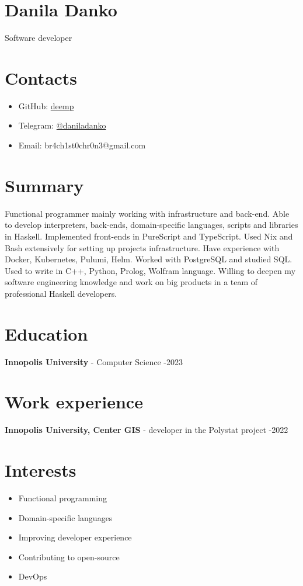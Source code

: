 \documentclass[twocolumn,11pt]{report}
\begin{document}
\section*{\huge Danila Danko}

Software developer

\section*{Contacts}
\begin{itemize}
     \item GitHub: \href{https://github.com/deemp}{deemp}
     \item Telegram: \href{https://t.me/daniladanko}{@daniladanko}
     \item Email: br4ch1st0chr0n3@gmail.com
\end{itemize}

\section*{Summary}
Functional programmer mainly working with infrastructure and back-end.
Able to develop interpreters, back-ends, domain-specific languages, scripts and libraries in Haskell.
Implemented front-ends in PureScript and TypeScript.
Used Nix and Bash extensively for setting up projects infrastructure.
Have experience with Docker, Kubernetes, Pulumi, Helm.
Worked with PostgreSQL and studied SQL.
Used to write in C++, Python, Prolog, Wolfram language.
Willing to deepen my software engineering knowledge and work on big products in a team of professional Haskell developers.


\section*{Education}

\textbf{Innopolis University} - Computer Science -2023

\section*{Work experience}

\textbf{Innopolis University, Center GIS} - developer in the Polystat project -2022

\newpage

\section*{Interests}
\begin{itemize}
     \item Functional programming
     \item Domain-specific languages
     \item Improving developer experience
     \item Contributing to open-source
     \item DevOps
\end{itemize}
\end{document}
